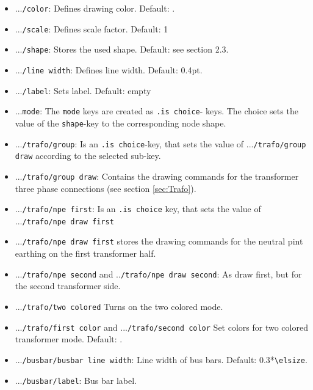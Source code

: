 \documentclass[a4]{article}
\begin{document}
\begin{itemize}
\item ...\verb+/color+: Defines drawing color. Default: . 
\item ...\verb+/scale+: Defines scale factor. Default: 1
\item ...\verb+/shape+: Stores the used shape. Default: see section 2.3. 
\item ...\verb+/line width+: Defines line width. Default:  0.4pt.
\item ...\verb+/label+: Sets label. Default: empty
\item ...\verb+mode+: The \verb+mode+ keys are created as \verb+.is choice+- keys. The choice sets the value of the \verb+shape+-key to the corresponding node shape.
\item ...\verb+/trafo/group+: Is an \verb+.is choice+-key, that sets the value of ...\verb+/trafo/group draw+ according to the selected sub-key.
\item ...\verb+/trafo/group draw+: Contains the drawing commands for the transformer three phase connections (see section \ref{sec:Trafo}).
\item ...\verb+/trafo/npe first+: Is an \verb+.is choice+ key, that sets the value of ...\verb+/trafo/npe draw first+
\item ...\verb+/trafo/npe draw first+ stores the drawing commands for the neutral pint earthing on the first transformer half.
\item ...\verb+/trafo/npe second+ and ..\verb+/trafo/npe draw second+: As draw first, but for the second transformer side.
\item ...\verb+/trafo/two colored+ Turns on the two colored mode.
\item ...\verb+/trafo/first color+ and ...\verb+/trafo/second color+ Set colors for two colored transformer mode. Default: .
\item ...\verb+/busbar/busbar line width+: Line width of bus bars. Default: 0.3*\verb+\elsize+.
\item ...\verb+/busbar/label+: Bus bar label. 
\end{itemize}
\onehalfspacing
\end{document}

